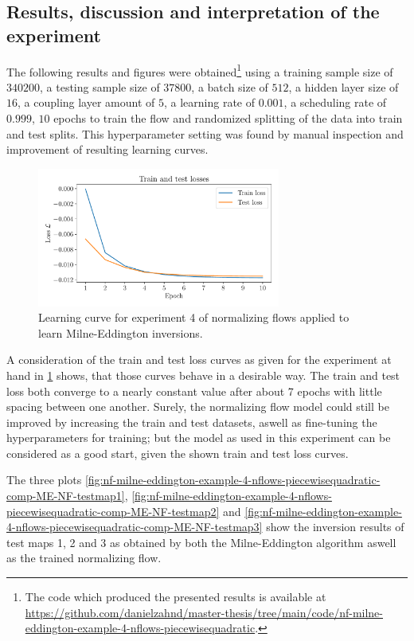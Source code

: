 \documentclass[a4paper,12pt]{report}
\begin{document}
\subsection{Results, discussion and interpretation of the experiment}
The following results and figures were obtained\footnote{The code which produced the presented results is available at \url{https://github.com/danielzahnd/master-thesis/tree/main/code/nf-milne-eddington-example-4-nflows-piecewisequadratic}.} using a training sample size of $340200$, a testing sample size of $37800$, a batch size of $512$, a hidden layer size of $16$, a coupling layer amount of $5$, a learning rate of $0.001$, a scheduling rate of $0.999$, $10$ epochs to train the flow and randomized splitting of the data into train and test splits. This hyperparameter setting was found by manual inspection and improvement of resulting learning curves.

\begin{figure}[h]
\centering
\includegraphics[width=8cm]{figures/nf-milne-eddington-example-4-loss-nflows-piecewisequadratic.pdf}
\caption{Learning curve for experiment 4 of normalizing flows applied to learn Milne-Eddington inversions.}
\label{fig:nf-milne-eddington-example-4-loss-nflows-piecewisequadratic}
\end{figure}

A consideration of the train and test loss curves as given for the experiment at hand in \cref{fig:nf-milne-eddington-example-4-loss-nflows-piecewisequadratic} shows, that those curves behave in a desirable way. The train and test loss both converge to a nearly constant value after about 7 epochs with little spacing between one another. Surely, the normalizing flow model could still be improved by increasing the train and test datasets, aswell as fine-tuning the hyperparameters for training; but the model as used in this experiment can be considered as a good start, given the shown train and test loss curves.

The three plots \cref{fig:nf-milne-eddington-example-4-nflows-piecewisequadratic-comp-ME-NF-testmap1}, \cref{fig:nf-milne-eddington-example-4-nflows-piecewisequadratic-comp-ME-NF-testmap2} and \cref{fig:nf-milne-eddington-example-4-nflows-piecewisequadratic-comp-ME-NF-testmap3} show the inversion results of test maps 1, 2 and 3 as obtained by both the Milne-Eddington algorithm aswell as the trained normalizing flow.
\end{document}
